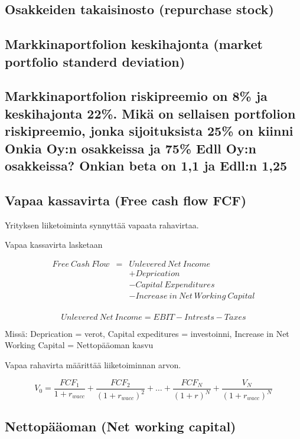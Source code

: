 \documentclass[a4paper]{article}
\begin{document}
\subsection{Osakkeiden takaisinosto (repurchase stock)}

\subsection{Markkinaportfolion keskihajonta (market portfolio standerd deviation)}



\subsection{Markkinaportfolion riskipreemio on 8\% ja keskihajonta 22\%. Mikä on sellaisen portfolion riskipreemio, jonka sijoituksista 25\% on kiinni Onkia Oy:n osakkeissa ja 75\% Edll Oy:n osakkeissa? Onkian beta on 1,1 ja Edll:n 1,25}

\subsection{Vapaa kassavirta (Free cash flow FCF)}

Yrityksen liiketoiminta synnyttää vapaata rahavirtaa.

Vapaa kassavirta lasketaan

\[
\begin{array}{lcl}
Free\ Cash\ Flow & = & Unlevered\ Net\ Income \\
 & & + Deprication \\
 & & - Capital\ Expenditures \\
 & & - Increase\ in\ Net\ Working\ Capital \\
\end{array}
\]

\[Unlevered\ Net\ Income = EBIT - Intrests - Taxes\]


Missä: Deprication = verot, Capital expeditures = investoinni, Increase in Net Working Capital = Nettopääoman kasvu

Vapaa rahavirta määrittää liiketoiminnan arvon.

\[
V_0 = \frac{FCF_1}{1 + r_{wacc}} + \frac{FCF_2}{(1 + r_{wacc})^2} + \dots + \frac{FCF_N}{(1 + r)^N} + \frac{V_N}{(1 + r_{wacc})^N}
\]

\subsection{Nettopääoman (Net working capital)}
\end{document}
